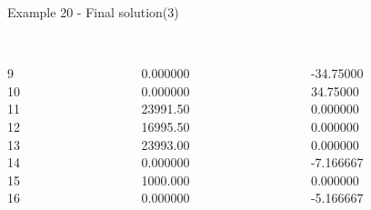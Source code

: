 \begin{frame}{Example 20 - Final solution(3)}
\footnotesize

\begin{columns}[t]
\begin{column}{0.3\textwidth}
\\
9\\
10\\
11\\
12\\
13\\
14\\
15\\
16\\

\end{column}

\begin{column}{0.3\textwidth}
\\
0.000000\\
0.000000\\
23991.50\\
16995.50\\
23993.00\\
0.000000\\
1000.000\\
0.000000\\
\end{column}  

\begin{column}{0.3\textwidth}
\\
-34.75000\\
34.75000\\
0.000000\\
0.000000\\
0.000000\\
-7.166667\\
0.000000\\
-5.166667\\

\end{column}
\end{columns}
\end{frame}

